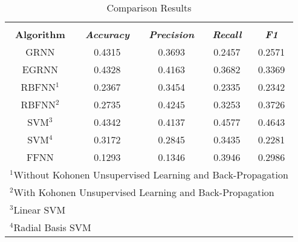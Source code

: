 \documentclass[conference]{IEEEtran}
\begin{document}
 \begin{table}[htbp]
 \caption{Comparison Results}
 \begin{center}
 \begin{tabular}{|c|c|c|c|c|}
 \hline
 \textbf{}&\multicolumn{4}{|c|}{\textbf{}} \\
 \cline{2-5} 
 \textbf{Algorithm} & \textbf{\textit{Accuracy}} & \textbf{\textit{Precision}} & \textbf{\textit{Recall}} & \textbf{\textit{F1}} \\
 \hline
 GRNN & 0.4315 &  0.3693 &  0.2457 &  0.2571 \\
 EGRNN & 0.4328 &  0.4163 &  0.3682 &  0.3369 \\
 RBFNN$^{\mathrm{1}}$& 0.2367 &  0.3454 &  0.2335 &  0.2342 \\
 RBFNN$^{\mathrm{2}}$& 0.2735 &  0.4245 &  0.3253 &  0.3726 \\
 SVM$^{\mathrm{3}}$ & 0.4342 &  0.4137 &  0.4577 &  0.4643 \\
 SVM$^{\mathrm{4}}$ & 0.3172 &  0.2845 &  0.3435 &  0.2281 \\
 FFNN & 0.1293 &  0.1346 &  0.3946 &  0.2986 \\
 \hline
 \multicolumn{5}{l}{$^{\mathrm{1}}$Without Kohonen Unsupervised Learning and Back-Propagation} \\
 \multicolumn{5}{l}{$^{\mathrm{2}}$With Kohonen Unsupervised Learning and Back-Propagation} \\
 \multicolumn{5}{l}{$^{\mathrm{3}}$Linear SVM} \\
 \multicolumn{5}{l}{$^{\mathrm{4}}$Radial Basis SVM} \\
 \end{tabular}
 \label{table_comparison_results}
 \end{center}
 \end{table}

%
%
\end{document}
